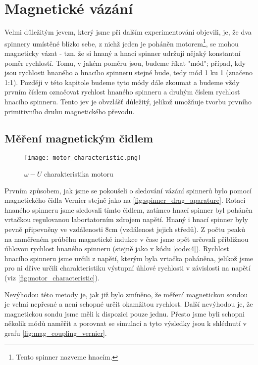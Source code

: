 \chapter{Magnetické vázání}

Velmi důležitým jevem, který jsme při dalším experimentování objevili, je, že dva spinnery umístěné blízko sebe, z nichž jeden je poháněn motorem\footnote{Tento spinner nazveme hnacím.}, se mohou magneticky vázat - tzn. že si hnaný a hnací spinner udržují nějaký konstantní poměr rychlostí.
Tomu, v jakém poměru jsou, budeme říkat "mód"; případ, kdy jsou rychlosti hnaného a hnacího spinneru stejné bude, tedy mód 1 ku 1 (značeno 1:1). Později v této kapitole budeme tyto módy dále zkoumat a budeme vždy prvním číslem označovat rychlost hnaného spinneru a druhým číslem rychlost hnacího spinneru. Tento jev je obvzlášť důležitý, jelikož umožňuje tvorbu prvního primitivního druhu magnetického převodu.

\section{Měření magnetickým čidlem}

\begin{wrapfigure}{r}{0.5\textwidth}
    \texttt{[image: motor\_characteristic.png]}
    \centering
    \caption[$\omega - U$ charakteristika motoru]{$\omega - U$ charakteristika motoru}
    \label{fig:motor_characteristic}
\end{wrapfigure}

Prvním způsobem, jak jsme se pokoušeli o sledování vázání spinnerů bylo pomocí magnetického čidla Vernier stejně jako na \autoref{fig:spinner_drag_aparature}. Rotaci hnaného spinneru jsme sledovali tímto čidlem, zatímco hnací spinner byl poháněn vrtačkou regulovanou labortatorním zdrojem napětí. Hnaný i hnací spinner byly pevně připevněny ve vzdálenosti 8cm (vzdálenost jejich středů).
Z počtu peaků na naměřeném průběhu magnetické indukce v čase jsme opět určovali přibližnou úhlovou rychlost hnaného spinneru (stejně jako v kódu \ref{code:4}). Rychlost hnacího spinneru jsme určili z napětí, kterým byla vrtačka poháněna, jelikož jsme pro ni dříve určili charakteristiku výstupní úhlové rychlosti v závislosti na napětí (viz \autoref{fig:motor_characteristic}).

Nevýhodou této metody je, jak již bylo zmíněno, že měření magnetickou sondou je velmi nepřesné a není schopné určit okamžitou rychlost. Další nevýhodou je, že magnetickou sondu jsme měli k dispozici pouze jednu. Přesto jsme byli schopni několik módů naměřit a porovnat se simulací a tyto výsledky jsou k shlédnutí v grafu \ref{fig:mag_coupling_vernier}.

